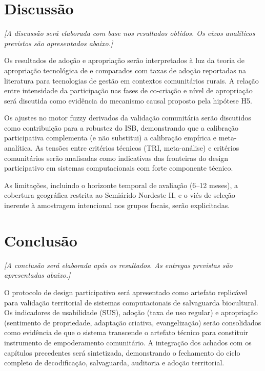 \section{Discussão}

\textit{[A discussão será elaborada com base nos resultados obtidos. Os eixos analíticos previstos são apresentados abaixo.]}

Os resultados de adoção e apropriação serão interpretados à luz da teoria de apropriação tecnológica de  e comparados com taxas de adoção reportadas na literatura para tecnologias de gestão em contextos comunitários rurais. A relação entre intensidade da participação nas fases de co-criação e nível de apropriação será discutida como evidência do mecanismo causal proposto pela hipótese H5.

Os ajustes no motor fuzzy derivados da validação comunitária serão discutidos como contribuição para a robustez do ISB, demonstrando que a calibração participativa complementa (e não substitui) a calibração empírica e meta-analítica. As tensões entre critérios técnicos (TRI, meta-análise) e critérios comunitários serão analisadas como indicativas das fronteiras do design participativo em sistemas computacionais com forte componente técnico.

As limitações, incluindo o horizonte temporal de avaliação (6--12 meses), a cobertura geográfica restrita ao Semiárido Nordeste II, e o viés de seleção inerente à amostragem intencional nos grupos focais, serão explicitadas.


\section{Conclusão}

\textit{[A conclusão será elaborada após os resultados. As entregas previstas são apresentadas abaixo.]}

O protocolo de design participativo será apresentado como artefato replicável para validação territorial de sistemas computacionais de salvaguarda biocultural. Os indicadores de usabilidade (SUS), adoção (taxa de uso regular) e apropriação (sentimento de propriedade, adaptação criativa, evangelização) serão consolidados como evidência de que o sistema transcende o artefato técnico para constituir instrumento de empoderamento comunitário. A integração dos achados com os capítulos precedentes será sintetizada, demonstrando o fechamento do ciclo completo de decodificação, salvaguarda, auditoria e adoção territorial.


